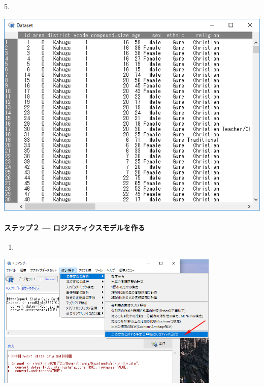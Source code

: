 \documentclass[11pt,]{problemset}
\let\oldparagraph\paragraph
\renewcommand{\paragraph}[1]{\oldparagraph{#1}\mbox{}}
\begin{document}
\newpage

\vfill
5.

\begin{center}\includegraphics[width=0.7\linewidth]{pic/logstic04} \end{center}

\paragraph{ステップ２ --- ロジスティクスモデルを作る}\label{-}

\begin{enumerate}
\def\labelenumi{\arabic{enumi}.}
\setcounter{enumi}{5}
\item
\end{enumerate}

\begin{center}\includegraphics[width=0.8\textwidth,height=0.9\textwidth]{pic/logstic05} \end{center}
\end{document}
